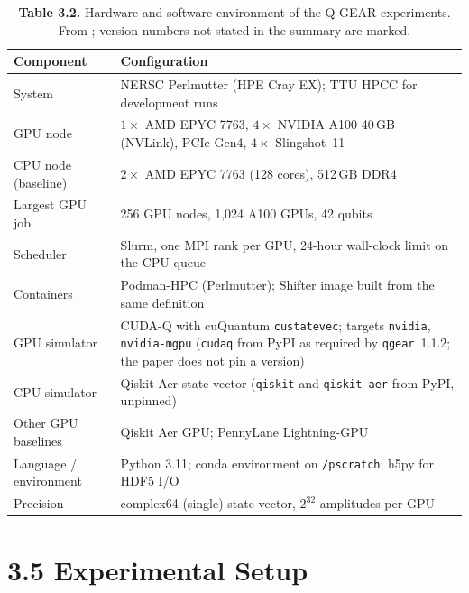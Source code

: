 \documentclass{report}
\theoremstyle{plain}
\theoremstyle{definition}
\theoremstyle{remark}
\begin{document}
\begin{table}[htbp]
\caption{\textbf{Table 3.2.} Hardware and software environment of the Q-GEAR experiments. From \cite{guo2025qgear,guo2025qgearsoftware}; version numbers not stated in the summary are marked.}
\label{tab:qgear:env}
 \small
\begin{tabular}{ll}
\toprule
Component & Configuration \\
\midrule
System & NERSC Perlmutter (HPE Cray EX); TTU HPCC for development runs \\
GPU node & $1\times$ AMD EPYC 7763, $4\times$ NVIDIA A100 40 GB (NVLink), PCIe Gen4, $4\times$ Slingshot~11 \\
CPU node (baseline) & $2\times$ AMD EPYC 7763 (128 cores), 512 GB DDR4 \\
Largest GPU job & 256 GPU nodes, 1,024 A100 GPUs, 42 qubits \\
Scheduler & Slurm, one MPI rank per GPU, 24-hour wall-clock limit on the CPU queue \\
Containers & Podman-HPC (Perlmutter); Shifter image built from the same definition \\
GPU simulator & CUDA-Q with cuQuantum \texttt{custatevec}; targets \texttt{nvidia}, \texttt{nvidia-mgpu} (\texttt{cudaq} from PyPI as required by \texttt{qgear}~1.1.2; the paper does not pin a version) \\
CPU simulator & Qiskit Aer state-vector (\texttt{qiskit} and \texttt{qiskit-aer} from PyPI, unpinned) \\
Other GPU baselines & Qiskit Aer GPU; PennyLane Lightning-GPU \\
Language / environment & Python 3.11; conda environment on \texttt{/pscratch}; h5py for HDF5 I/O \\
Precision & complex64 (single) state vector, $2^{32}$ amplitudes per GPU \\
\bottomrule
\end{tabular}
\end{table}

\section{3.5 Experimental Setup}\label{sec:qgear:setup}
\end{document}
